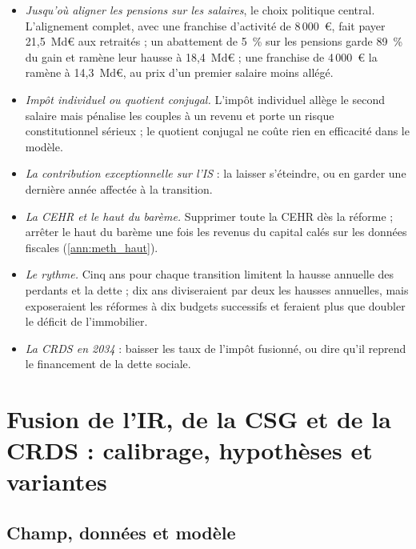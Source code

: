 \documentclass[11pt,a4paper]{article}
\begin{document}
\begin{itemize}\setlength{\itemsep}{1pt}
\item \emph{Jusqu'où aligner les pensions sur les salaires}, le choix politique central. L'alignement complet, avec une
franchise d'activité de 8\,000~€, fait payer 21,5~Md€ aux retraités ; un abattement de 5~\% sur les pensions garde
89~\% du gain et ramène leur hausse à 18,4~Md€ ; une franchise de 4\,000~€ la ramène à 14,3~Md€, au prix d'un premier
salaire moins allégé.
\item \emph{Impôt individuel ou quotient conjugal.} L'impôt individuel allège le second salaire mais pénalise les couples
à un revenu et porte un risque constitutionnel sérieux ; le quotient conjugal ne coûte rien en efficacité dans le
modèle.
\item \emph{La contribution exceptionnelle sur l'IS} : la laisser s'éteindre, ou en garder une dernière année affectée à
la transition.
\item \emph{La CEHR et le haut du barème.} Supprimer toute la CEHR dès la réforme ; arrêter le haut du barème une fois
les revenus du capital calés sur les données fiscales (\ref{ann:meth_haut}).
\item \emph{Le rythme.} Cinq ans pour chaque transition limitent la hausse annuelle des perdants et la dette ; dix ans
diviseraient par deux les hausses annuelles, mais exposeraient les réformes à dix budgets successifs et feraient plus
que doubler le déficit de l'immobilier.
\item \emph{La CRDS en 2034} : baisser les taux de l'impôt fusionné, ou dire qu'il reprend le financement de la dette
sociale.
\end{itemize}


\clearpage
\appendix
\renewcommand{\thesection}{Annexe \Alph{section}}
\section{Fusion de l'IR, de la CSG et de la CRDS : calibrage, hypothèses et variantes}\label{ann:ircsg}

\subsection{Champ, données et modèle}
\end{document}
